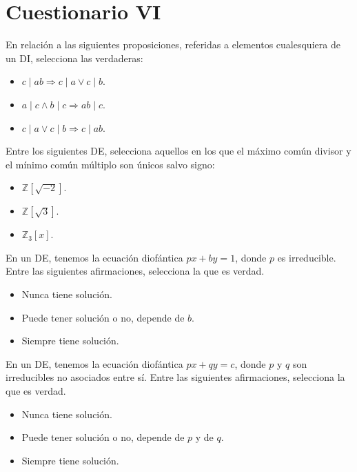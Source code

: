 \section{Cuestionario VI}

\begin{ejercicio}
    En relación a las siguientes proposiciones, referidas a elementos cualesquiera de un DI, selecciona las verdaderas:
    \begin{itemize}
        \item $c\mid ab \Longrightarrow c\mid a \lor c\mid b$.
        \item $a\mid c \land b\mid c \Longrightarrow ab\mid c$. 
        \item $c\mid a \lor c\mid b \Longrightarrow c\mid ab$.
    \end{itemize}
\end{ejercicio}

\begin{ejercicio}
    Entre los siguientes DE, selecciona aquellos en los que el máximo común divisor y el mínimo común múltiplo son únicos salvo signo:
    \begin{itemize}
        \item $\mathbb{Z}\left[\sqrt{-2}\right]$.
        \item $\mathbb{Z}\left[\sqrt{3}\right]$. 
        \item $\mathbb{Z}_3[x]$.
    \end{itemize}
\end{ejercicio}

\begin{ejercicio}
    En un DE, tenemos la ecuación diofántica $px+by=1$, donde $p$ es irreducible. Entre las siguientes afirmaciones, selecciona la que es verdad.
    \begin{itemize}
        \item Nunca tiene solución.
        \item Puede tener solución o no, depende de $b$. 
        \item Siempre tiene solución.
    \end{itemize}
\end{ejercicio}

\begin{ejercicio}
    En un DE, tenemos la ecuación diofántica $px+qy=c$, donde $p$ y $q$ son irreducibles no asociados entre sí. Entre las siguientes afirmaciones, selecciona la que es verdad.
    \begin{itemize}
        \item Nunca tiene solución.
        \item Puede tener solución o no, depende de $p$ y de $q$. 
        \item Siempre tiene solución.
    \end{itemize}
\end{ejercicio}


